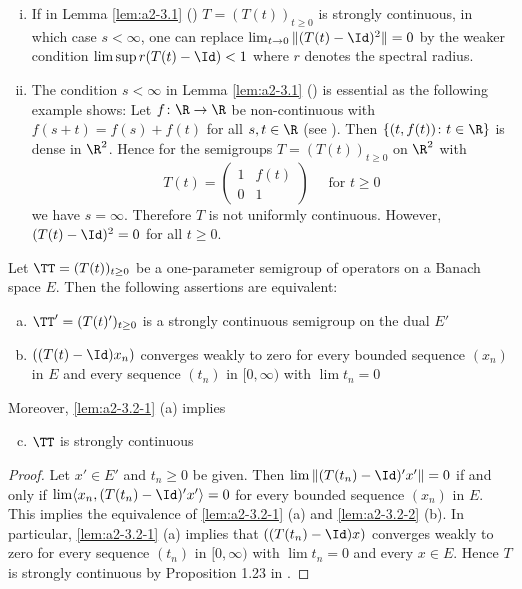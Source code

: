 \begin{remarks*}\label{rem:a2-3.1-kgk}
\begin{enumerate}[(i)]
\item \label{rem:a2-3.1-kgk-1}
If in Lemma \ref{lem:a2-3.1} () 
$T = (T(t))_{t \geq 0}$ is strongly continuous, in which case 
$s < \infty$, one can replace 
$\lim_{t \to 0} \|(T(t) - \Id)^2\| = 0$ by the weaker condition $\lim \sup r(T(t) - \Id) < 1$ \citet[Lemma 2]{lotz:1985} where $r$ denotes the spectral radius.
\item \label{rem:a2-3.1-kgk-2}
The condition $s < \infty$ in Lemma \ref{lem:a2-3.1} () 
is essential as the following example shows:
Let $f \colon \R \to \R$ be non-continuous with $f(s+t) = f(s) + f(t)$ for all $s, t \in \R$ (see \citet{hamel:1905}).
Then $\{(t,f(t)) \colon t \in \R\}$ is dense in $\R^2$.
Hence for the semigroups $T = (T(t))_{t \geq 0}$ on $\R^2$ with
\[
T(t) = \left( \begin{array}{cc}
    1 & f(t) \\
    0 & 1
\end{array} \right) \quad  \text{ for } t \geq 0
\]
we have $s = \infty$.
Therefore $T$ is not uniformly continuous.
However, $(T(t) - \Id)^{2} = 0$ for all $t \geq 0$.
\end{enumerate}
\end{remarks*}


\begin{lemma}\label{lem:a2-3.2}
Let $\TT = (T(t))_{t \geq 0}$ be a one-parameter semigroup of operators on a Banach space $E$.
Then the following assertions are equivalent:
\begin{enumerate}[(a)]
\item \label{lem:a2-3.2-1}
$\TT' = (T(t)')_{t \geq 0}$ is a strongly continuous semigroup on the dual $E'$
\item \label{lem:a2-3.2-2}
$((T(t) - \Id)x_n)$ converges weakly to zero for every bounded sequence $(x_n)$ in $E$ and every sequence $(t_n)$ in $[0,\infty)$ with $\lim t_n = 0$
\end{enumerate}
Moreover, \ref{lem:a2-3.2-1} (\lnm a) 
implies
\begin{enumerate}[(a)]
\setcounter{enumi}{2}
\item \label{lem:a2-3.2-3}
$\TT$ is strongly continuous
\end{enumerate}
\end{lemma}

\begin{proof}
Let $x' \in E'$ and $t_n \geq 0$ be given.
Then $\lim \|(T(t_n) - \Id)'x'\| = 0$ if and only if $\lim \langle x_n, (T(t_n) - \Id)'x' \rangle = 0$ for every bounded sequence $(x_n)$ in $E$.
This implies the equivalence of \ref{lem:a2-3.2-1} (\lnm a) and \ref{lem:a2-3.2-2} (\lnm b).
In particular, \ref{lem:a2-3.2-1} (\lnm a) implies that $((T(t_n) - \Id)x)$ converges weakly to zero for every sequence $(t_n)$ in $[0,\infty)$ with $\lim t_n = 0$ and every $x \in E$.
Hence $T$ is strongly continuous by Proposition 1.23 
in \citet{davies:1980}.
\end{proof}

